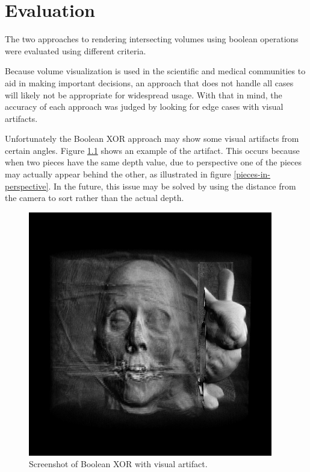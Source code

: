 \documentclass{report}
\begin{document}
\chapter{Evaluation}

The two approaches to rendering intersecting volumes using boolean operations
were evaluated using different criteria.

Because volume visualization is used in the scientific and medical communities
to aid in making important decisions, an approach that does not handle all cases
will likely not be appropriate for widespread usage.  With that in mind, the
accuracy of each approach was judged by looking for edge cases with visual
artifacts.

Unfortunately the Boolean XOR approach may show some visual artifacts from
certain angles.  Figure \ref{boolean-xor-with-artifact} shows an example of the
artifact.  This occurs because when two pieces have the same depth value, due to
perspective one of the pieces may actually appear behind the other, as
illustrated in figure \ref{pieces-in-perspective}.  In the future, this issue
may be solved by using the distance from the camera to sort rather than the
actual depth.

\begin{figure}
\centering
\includegraphics[width=0.95\textwidth]{boolean-xor-screenshot-3.png}
\caption{Screenshot of Boolean XOR with visual artifact.}
\label{boolean-xor-with-artifact}
\end{figure}
\end{document}

